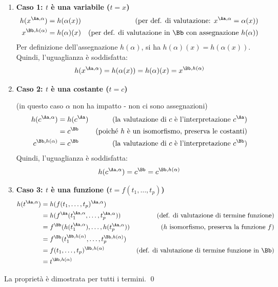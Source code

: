 \documentclass[a4paper,11pt]{report}
\begin{document}
\begin{proofframe}
\begin{enumerate}
    \item \textbf{Caso 1: $t$ è una variabile ($t = x$)}
    \begin{align*}
    h(x^{\Aa, \alpha}) &= h(\alpha(x)) & \text{(per def. di valutazione: } x^{\Aa, \alpha} = \alpha(x)\text{)} \\
    x^{\Bb, h(\alpha)} &= h(\alpha)(x) & \text{(per def. di valutazione in } \Bb \text{ con assegnazione } h(\alpha)\text{)}
    \end{align*}
    Per definizione dell'assegnazione $h(\alpha)$, si ha $h(\alpha)(x) = h(\alpha(x))$.
    Quindi, l'uguaglianza è soddisfatta:
    \[ h(x^{\Aa, \alpha}) = h(\alpha(x)) = h(\alpha)(x) = x^{\Bb, h(\alpha)} \]

    \item \textbf{Caso 2: $t$ è una costante ($t = c$)}

        (in questo caso \( \alpha \) non ha impatto - non ci sono assegnazioni) 
    \begin{align*}
    h(c^{\Aa, \alpha}) &= h(c^\Aa) & \text{(la valutazione di } c \text{ è l'interpretazione } c^\Aa \text{)} \\
    &= c^\Bb & \text{(poiché } h \text{ è un isomorfismo, preserva le costanti)} \\
    c^{\Bb, h(\alpha)} &= c^\Bb & \text{(la valutazione di } c \text{ è l'interpretazione } c^\Bb \text{)}
    \end{align*}
    Quindi, l'uguaglianza è soddisfatta:
    \[ h(c^{\Aa, \alpha}) = c^\Bb = c^{\Bb, h(\alpha)} \]

\item \textbf{Caso 3: $t$ è una funzione ($t = f(t_1, \ldots, t_p)$)}
\begin{align*}
h(t^{\Aa, \alpha}) &= h(f(t_1, \ldots, t_p)^{\Aa, \alpha}) \\
&= h(f^\Aa(t_1^{\Aa, \alpha}, \ldots, t_p^{\Aa, \alpha})) & \text{(def. di valutazione di termine funzione)} \\
&= f^\Bb(h(t_1^{\Aa, \alpha}), \ldots, h(t_p^{\Aa, \alpha})) & (h \text{ isomorfismo, preserva la funzione } f) \\
&= f^\Bb(t_1^{\Bb, h(\alpha)}, \ldots, t_p^{\Bb, h(\alpha)})\\
&= f(t_1, \ldots, t_p)^{\Bb, h(\alpha)} & \text{(def. di valutazione di termine funzione in } \Bb) \\
&= t^{\Bb, h(\alpha)}
\end{align*}

\end{enumerate}
La proprietà è dimostrata per tutti i termini. \qed
\end{proofframe}
\end{document}
